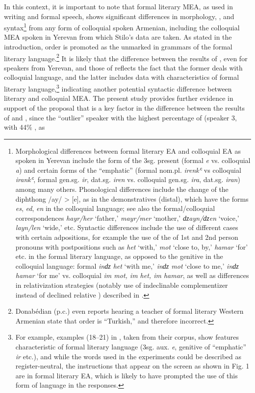 \documentclass[output=paper,colorlinks,citecolor=brown,draftmode]{langscibook}
\begin{document}
In this context, it is important to note that formal literary MEA, as used in writing and formal speech, shows significant differences in morphology, , and syntax\footnote{Morphological differences between formal literary EA and colloquial EA as spoken in Yerevan include the form of the 3sg. present  (formal \textit{e} vs. colloquial \textit{a}) and certain forms of the ``emphatic''  (formal nom.pl. \textit{irenkʿ} vs colloquial \textit{irankʿ}, formal gen.sg. \textit{ir}, dat.sg. \textit{iren} vs. colloquial gen.sg. \textit{ira}, dat.sg. \textit{iran}) among many others.  Phonological differences include the change of the diphthong /ay/ > [e], as in the demonstratives (distal), which have the forms \textit{es}, \textit{ed}, \textit{en} in the colloquial language; see also the formal/colloquial correspondences \textit{hayr/her} `father,' \textit{mayr/mer} `mother,' \textit{ǳayn/ǳen} `voice,' \textit{layn/len} `wide,' etc. Syntactic differences include the use of different cases with certain adpositions, for example the use of the  of 1st and 2nd person pronouns with postpositions such as \textit{het} `with,' \textit{mot} `close to, by,' \textit{hamar} `for' etc. in the formal literary language, as opposed to the genitive in the colloquial language: formal \textit{inǳ het} `with me,' \textit{inǳ mot} `close to me,' \textit{inǳ hamar} `for me' vs. colloquial \textit{im mot, im het, im hamar}, as well as differences in relativization strategies (notably use of indeclinable complementizer instead of declined relative ) described in \citet{hodgson_relative_2019}.} from any form of colloquial spoken Armenian, including the colloquial MEA spoken in Yerevan from which Stilo's data are taken. As stated in the introduction,  order is promoted as the unmarked  in grammars of the formal literary language.\footnote{Donabédian (p.c.) even reports hearing a teacher of formal literary Western Armenian state that  order is ``Turkish,'' and therefore incorrect.} It is likely that the difference between the results of \citet{stilo_preverbal_2018}, even for speakers from Yerevan, and those of \citet{samvelian_persistence_2023} reflects the fact that the former deals with colloquial language, and the latter includes data with characteristics of formal literary language,\footnote{For example, examples (18--21) in \citet{samvelian_persistence_2023}, taken from their corpus, show features characteristic of formal literary language (3sg. aux. \textit{e},  genitive of ``emphatic''  \textit{ir} etc.), and while the words used in the experiments could be described as register-neutral, the instructions that appear on the screen as shown in \citet{samvelian_persistence_2023} Fig. 1 are in formal literary EA, which is likely to have prompted the use of this form of language in the responses.} indicating another potential syntactic difference between literary and colloquial MEA. The present study provides further evidence in support of the proposal that  is a key factor in the difference between the results of \citet{stilo_preverbal_2018} and \citet{samvelian_persistence_2023}, since the ``outlier'' speaker with the highest percentage of  (speaker 3, with 44\% , as 
\end{document}
